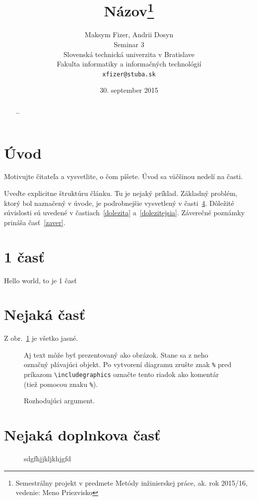 \documentclass[10pt,twoside,slovak,a4paper]{article}
\title{Názov\thanks{Semestrálny projekt v predmete Metódy inžinierskej práce, ak. rok 2015/16, vedenie: Meno Priezvisko}} %
\author{Maksym Fizer, Andrii Dosyn\\[2pt]
	{\small Seminar 3}\\
	{\small Slovenská technická univerzita v Bratislave}\\
	{\small Fakulta informatiky a informačných technológií}\\
	{\small \texttt{xfizer@stuba.sk}}
	}
\date{\small 30. september 2015} %
\begin{document}
\maketitle

\begin{abstract}
\ldots
\end{abstract}



\section{Úvod}

Motivujte čitateľa a vysvetlite, o čom píšete. Úvod sa väčšinou nedelí na časti.

Uveďte explicitne štruktúru článku. Tu je nejaký príklad.
Základný problém, ktorý bol naznačený v úvode, je podrobnejšie vysvetlený v časti~\ref{nejaka}.
Dôležité súvislosti sú uvedené v častiach~\ref{dolezita} a~\ref{dolezitejsia}.
Záverečné poznámky prináša časť~\ref{zaver}.




\section{1 časť} \label{1}

Hello world, to je 1 časť


\section{Nejaká časť} \label{nejaka}

Z obr.~\ref{f:rozhod} je všetko jasné. 

\begin{figure}[tbh]
\centering
Aj text môže byť prezentovaný ako obrázok. Stane sa z neho označný plávajúci objekt. Po vytvorení diagramu zrušte znak \texttt{\%} pred príkazom \verb|\includegraphics| označte tento riadok ako komentár (tiež pomocou znaku \texttt{\%}).
\caption{Rozhodujúci argument.}
\label{f:rozhod}
\end{figure}


\section{Nejaká doplnkova časť} \label{nejaka}


\begin{figure}[tbh]
sdgfhjjkljkhjgfd
\end{figure}
\end{document}
